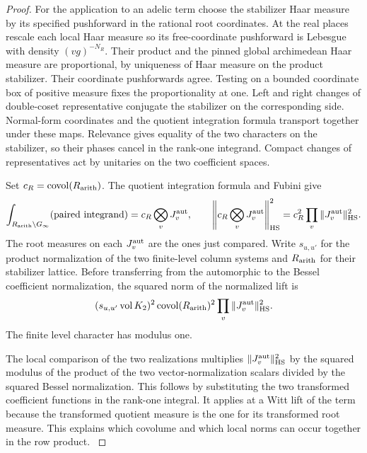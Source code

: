 \begin{proof}

For the application to an adelic term choose the stabilizer
Haar measure by its specified pushforward in the rational
root coordinates. At the real places rescale each local Haar
measure so its free-coordinate pushforward is Lebesgue with
density \((vg)^{-N_R}\). Their product and the pinned global
archimedean Haar measure are proportional, by uniqueness of
Haar measure on the product stabilizer. Their coordinate
pushforwards agree. Testing on a bounded coordinate box of
positive measure fixes the proportionality at one. Left and
right changes of double-coset representative conjugate the
stabilizer on the corresponding side. Normal-form coordinates
and the quotient integration formula transport together under
these maps. Relevance gives equality of the two characters
on the stabilizer, so their phases cancel in the rank-one
integrand. Compact changes of representatives act by unitaries
on the two coefficient spaces.


Set \(c_R=\operatorname{covol}(R_{\rm arith})\). The quotient
integration formula and Fubini give
\[
   \int_{R_{\rm arith}\backslash G_\infty}(\text{paired integrand})
        =c_R\bigotimes_v J_v^{\rm aut},\qquad
   \left\|c_R\bigotimes_v J_v^{\rm aut}\right\|_{\rm HS}^2
        =c_R^2\prod_v\|J_v^{\rm aut}\|_{\rm HS}^2 .
\]
The root measures on each \(J_v^{\rm aut}\) are the ones just
compared. Write \(s_{u,u'}\) for the
product normalization of the two finite-level column systems
and \(R_{\rm arith}\) for their stabilizer lattice. Before
transferring from the automorphic to the Bessel coefficient
normalization, the squared norm of the normalized lift is
\begin{equation}\label{eq:adelic-tensor-scale}
 (s_{u,u'}\operatorname{vol}K_2)^2
      \operatorname{covol}(R_{\rm arith})^2
      \prod_v\|J_v^{\rm aut}\|_{\rm HS}^2 .
\end{equation}
The finite level character has modulus
one.

The local comparison of the two realizations multiplies
\(\|J_v^{\rm aut}\|_{\rm HS}^2\) by the squared modulus of
the product of the two vector-normalization scalars divided by
the squared Bessel normalization. This follows by substituting
the two transformed coefficient functions in the rank-one
integral. It applies at a Witt lift of the term because the
transformed quotient measure is the one for its transformed
root measure. This explains which covolume and which local
norms can occur together in the row product.
\label{cor:absolute-amplitude-3}
\end{proof}
